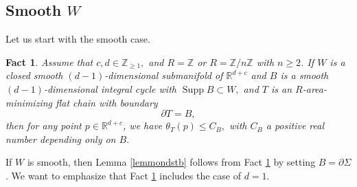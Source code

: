 \documentclass[11pt,a4paper]{amsart}
\numberwithin{equation}{section}
\newcommand{\supp}{\operatorname{Supp}}
\newcommand{\Si}{\Sigma}
\newcommand{\s}{\subset}
\newcommand{\pd}{\partial}
\newcommand{\R}{\mathbb{R}}
\newcommand{\Z}{\mathbb{Z}}
\theoremstyle{plain}
\newtheorem{fact}{Fact}[subsection]
\theoremstyle{definition}
\numberwithin{equation}{subsection}
\begin{document}
\subsection{Smooth $W$}
Let us start with the smooth case.
\begin{fact}\label{fctsmtw}
Assume that $c,d\in\Z_{\ge1},$ and $R=\Z$ or $R=\Z/n\Z$ with $n\ge 2$. 
If $W$ is a closed smooth $(d-1)$-dimensional submanifold of $\R^{d+c}$ and $B$ is a smooth $(d-1)$-dimensional integral cycle with $\supp B\s W,$ and $T$ is an $R$-area-minimizing flat chain with boundary $$\pd T=B,$$ then for any point $p\in\R^{d+c}$, we have $\theta_T(p)\le C_{B},$ with $C_{B}$ a positive real number depending only on $B.$
\end{fact}
If $W$ is smooth, then Lemma \ref{lemmondstb} follows from Fact \ref{fctsmtw} by setting $B=\pd\Si$. We want to emphasize that Fact \ref{fctsmtw} includes the case of $d=1$.
\end{document}
